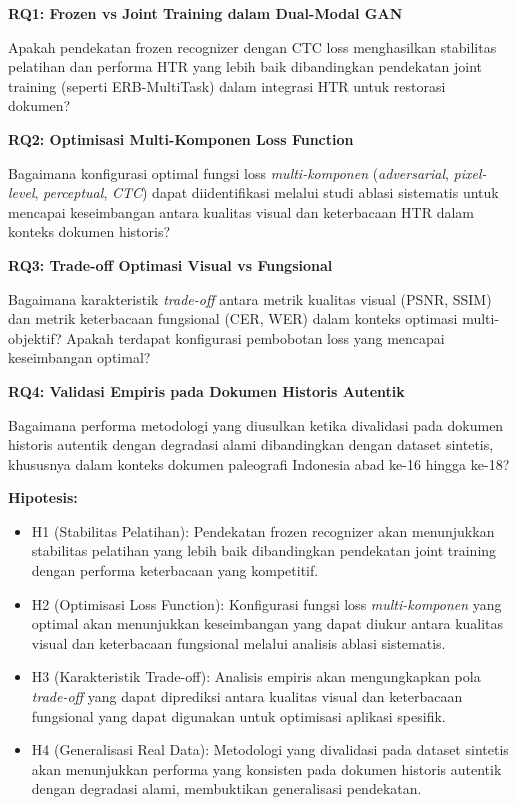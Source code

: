 \textbf{RQ1: Frozen vs Joint Training dalam Dual-Modal GAN}

Apakah pendekatan frozen recognizer dengan CTC loss menghasilkan stabilitas pelatihan dan performa HTR yang lebih baik dibandingkan pendekatan joint training (seperti ERB-MultiTask) dalam integrasi HTR untuk restorasi dokumen?

\textbf{RQ2: Optimisasi Multi-Komponen Loss Function}

Bagaimana konfigurasi optimal fungsi loss \textit{multi-komponen} (\textit{adversarial}, \textit{pixel-level}, \textit{perceptual}, \textit{CTC}) dapat diidentifikasi melalui studi ablasi sistematis untuk mencapai keseimbangan antara kualitas visual dan keterbacaan HTR dalam konteks dokumen historis?

\textbf{RQ3: Trade-off Optimasi Visual vs Fungsional}

Bagaimana karakteristik \textit{trade-off} antara metrik kualitas visual (PSNR, SSIM) dan metrik keterbacaan fungsional (CER, WER) dalam konteks optimasi multi-objektif? Apakah terdapat konfigurasi pembobotan loss yang mencapai keseimbangan optimal?

\textbf{RQ4: Validasi Empiris pada Dokumen Historis Autentik}

Bagaimana performa metodologi yang diusulkan ketika divalidasi pada dokumen historis autentik dengan degradasi alami dibandingkan dengan dataset sintetis, khususnya dalam konteks dokumen paleografi Indonesia abad ke-16 hingga ke-18?

\vspace{0.5ex}
\noindent\textbf{Hipotesis:}

\begin{itemize}
 \item H1 (Stabilitas Pelatihan): Pendekatan frozen recognizer akan menunjukkan stabilitas pelatihan yang lebih baik dibandingkan pendekatan joint training dengan performa keterbacaan yang kompetitif.

 \item H2 (Optimisasi Loss Function): Konfigurasi fungsi loss \textit{multi-komponen} yang optimal akan menunjukkan keseimbangan yang dapat diukur antara kualitas visual dan keterbacaan fungsional melalui analisis ablasi sistematis.

 \item H3 (Karakteristik Trade-off): Analisis empiris akan mengungkapkan pola \textit{trade-off} yang dapat diprediksi antara kualitas visual dan keterbacaan fungsional yang dapat digunakan untuk optimisasi aplikasi spesifik.

 \item H4 (Generalisasi Real Data): Metodologi yang divalidasi pada dataset sintetis akan menunjukkan performa yang konsisten pada dokumen historis autentik dengan degradasi alami, membuktikan generalisasi pendekatan.
\end{itemize}

